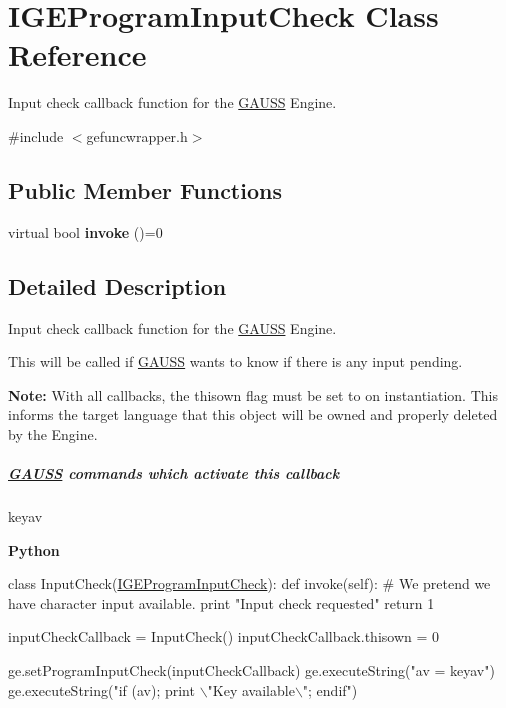 \hypertarget{class_i_g_e_program_input_check}{}\section{I\+G\+E\+Program\+Input\+Check Class Reference}
\label{class_i_g_e_program_input_check}


Input check callback function for the \hyperlink{class_g_a_u_s_s}{G\+A\+U\+SS} Engine.  




{\ttfamily \#include $<$gefuncwrapper.\+h$>$}

\subsection*{Public Member Functions}
\begin{DoxyCompactItemize}
\item 
\mbox{\label{class_i_g_e_program_input_check_ad3353c3f7f7987d261fa17e717cc5eca}} 
virtual bool {\bfseries invoke} ()=0
\end{DoxyCompactItemize}


\subsection{Detailed Description}
Input check callback function for the \hyperlink{class_g_a_u_s_s}{G\+A\+U\+SS} Engine. 

This will be called if \hyperlink{class_g_a_u_s_s}{G\+A\+U\+SS} wants to know if there is any input pending.

{\bfseries Note\+:} With all callbacks, the {\ttfamily thisown} flag must be set to {} on instantiation. This informs the target language that this object will be owned and properly deleted by the Engine.

\subparagraph*{\hyperlink{class_g_a_u_s_s}{G\+A\+U\+SS} commands which activate this callback}


\begin{DoxyItemize}
\item {\ttfamily keyav}
\end{DoxyItemize}

{\bfseries Python} 
\begin{DoxyCode}
\textcolor{keyword}{class }InputCheck(\hyperlink{class_i_g_e_program_input_check}{IGEProgramInputCheck}):
    \textcolor{keyword}{def }invoke(self):
        \textcolor{comment}{# We pretend we have character input available.}
        \textcolor{keywordflow}{print} \textcolor{stringliteral}{"Input check requested"}
        \textcolor{keywordflow}{return} 1

inputCheckCallback = InputCheck()
inputCheckCallback.thisown = 0

ge.setProgramInputCheck(inputCheckCallback)
ge.executeString(\textcolor{stringliteral}{"av = keyav"})
ge.executeString(\textcolor{stringliteral}{"if (av); print \(\backslash\)"Key available\(\backslash\)"; endif"})
\end{DoxyCode}


